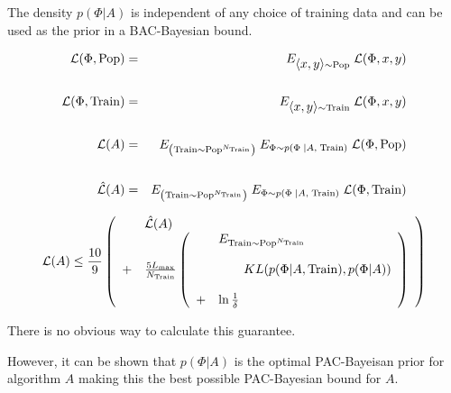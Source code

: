 {\vfill
The density $p(\Phi|A)$ is independent of any choice of training data and can be used as the prior in a BAC-Bayesian bound.


\begin{eqnarray*}
{\cal L}(\Phi,\mathrm{Pop}) & = & E_{{\mbox{$\langle x,y\rangle$}} \sim \mathrm{Pop}}\;{\cal L}(\Phi,x,y) \\
\\
{\cal L}(\Phi,\mathrm{Train}) & = & E_{{\mbox{$\langle x,y\rangle$}} \sim \mathrm{Train}}\;{\cal L}(\Phi,x,y) \\
\\
{\cal L}(A) & = & E_{\left(\mathrm{Train} \sim \mathrm{Pop}^{N_\mathrm{Train}}\right)}\;E_{\Phi \sim p(\Phi\;|A,\;\mathrm{Train})}\;{\cal L}(\Phi,\mathrm{Pop}) \\
\\
\hat{\cal L}(A) & = & E_{\left(\mathrm{Train} \sim \mathrm{Pop}^{N_\mathrm{Train}}\right)}\;E_{\Phi \sim p(\Phi\;|A,\;\mathrm{Train})}\;{\cal L}(\Phi,\mathrm{Train})
\end{eqnarray*}

\vfill
$${\cal L}(A) \leq \frac{10}{9}\left(
\begin{array}{ll} & \hat{\cal L}(A) \\
                  + & \frac{5L_{\max}}{N_\mathrm{Train}}\left(\begin{array}{ll} & E_{\mathrm{Train} \sim \mathrm{Pop}^{N_{\mathrm{Train}}}} \\
                                                                                \\                                                           
                                                                              & ~~~~~~KL(p(\Phi|A,\mathrm{Train}),p(\Phi|A)) \\
                                                                                \\
                                                                             + & \ln\frac{1}{\delta}\end{array}\right)
 \end{array}\right)$$

\vfill
There is no obvious way to calculate this guarantee.

\vfill
However, it can be shown that $p(\Phi|A)$ is the optimal PAC-Bayeisan prior for algorithm $A$ making this the best possible PAC-Bayesian bound for $A$.


}

